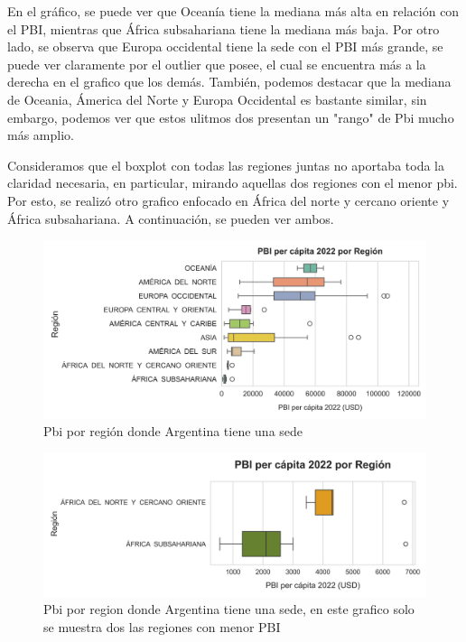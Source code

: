 \documentclass[10pt,a4paper]{article}
\begin{document}
\vspace{12pt}

En el gráfico, se puede ver que Oceanía tiene la mediana más alta en relación con el PBI, mientras que África subsahariana tiene la mediana más baja. Por otro lado, se observa que Europa occidental tiene la sede con el PBI más grande, se puede ver claramente por el outlier que posee, el cual se encuentra más a la derecha en el grafico que los demás. También, podemos destacar que la mediana de Oceania, Ámerica del Norte y Europa Occidental es bastante similar, sin embargo, podemos ver que estos ulitmos dos presentan un "rango" de Pbi mucho más amplio. \par
Consideramos que el boxplot con todas las regiones juntas no aportaba toda la claridad necesaria, en particular, mirando aquellas dos regiones con el menor pbi. Por esto, se realizó otro grafico enfocado en África del norte y cercano oriente y  África subsahariana. A continuación, se pueden ver ambos.

\newpage

\begin{figure}[!]
  \centering
  \includegraphics[width=1\textwidth]{boxplot_regiones.png}
  \caption{Pbi por región donde Argentina tiene una sede}
  \label{fig:Tabla 2}
\end{figure}

\begin{figure}[!] %
  \centering
  \includegraphics[width=1\textwidth]{boxplot_ultimas.png}
  \caption{ Pbi por region donde Argentina tiene una sede, en este grafico solo se muestra dos las regiones con menor PBI }
  \label{fig:Tabla 2}
\end{figure} \vspace{0.1cm}
\end{document}
